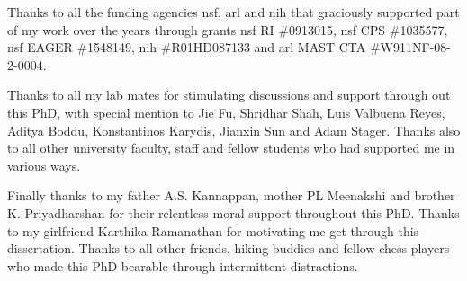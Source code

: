 Thanks to all the funding agencies \gls{nsf}, \gls{arl} and \gls{nih} that graciously supported part of my work over the years through grants \gls{nsf} RI \#0913015, \gls{nsf} CPS \#1035577, \gls{nsf} EAGER \#1548149, \gls{nih} \#R01HD087133 and \gls{arl} MAST CTA \#W911NF-08-2-0004.

Thanks to all my lab mates for stimulating discussions and support through out this PhD, with special mention to Jie Fu, Shridhar Shah, Luis Valbuena Reyes, Aditya Boddu, Konstantinos Karydis, Jianxin Sun and Adam Stager. Thanks also to all other university faculty, staff and fellow students who had supported me in various ways.

Finally thanks to my father A.S. Kannappan, mother PL Meenakshi and brother K. Priyadharshan for their relentless moral support throughout this PhD. Thanks to my girlfriend Karthika Ramanathan for motivating me get through this dissertation. Thanks to all other friends, hiking buddies and fellow chess players who made this PhD bearable through intermittent distractions.